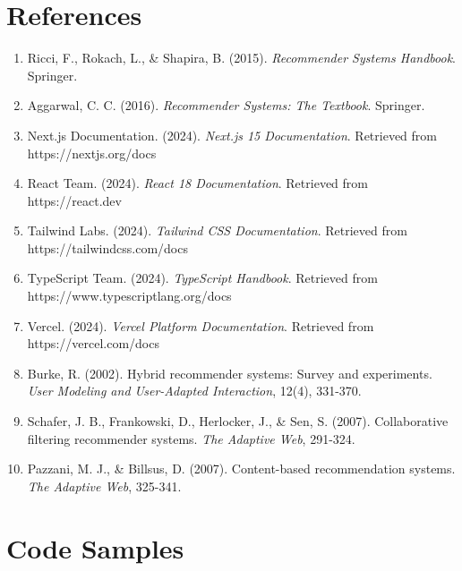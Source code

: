 \documentclass[12pt,a4paper]{article}
\begin{document}
\section*{References}

\begin{enumerate}
    \item Ricci, F., Rokach, L., \& Shapira, B. (2015). \textit{Recommender Systems Handbook}. Springer.
    
    \item Aggarwal, C. C. (2016). \textit{Recommender Systems: The Textbook}. Springer.
    
    \item Next.js Documentation. (2024). \textit{Next.js 15 Documentation}. Retrieved from https://nextjs.org/docs
    
    \item React Team. (2024). \textit{React 18 Documentation}. Retrieved from https://react.dev
    
    \item Tailwind Labs. (2024). \textit{Tailwind CSS Documentation}. Retrieved from https://tailwindcss.com/docs
    
    \item TypeScript Team. (2024). \textit{TypeScript Handbook}. Retrieved from https://www.typescriptlang.org/docs
    
    \item Vercel. (2024). \textit{Vercel Platform Documentation}. Retrieved from https://vercel.com/docs
    
    \item Burke, R. (2002). Hybrid recommender systems: Survey and experiments. \textit{User Modeling and User-Adapted Interaction}, 12(4), 331-370.
    
    \item Schafer, J. B., Frankowski, D., Herlocker, J., \& Sen, S. (2007). Collaborative filtering recommender systems. \textit{The Adaptive Web}, 291-324.
    
    \item Pazzani, M. J., \& Billsus, D. (2007). Content-based recommendation systems. \textit{The Adaptive Web}, 325-341.
\end{enumerate}

\newpage

\appendix

\section{Code Samples}
\end{document}
